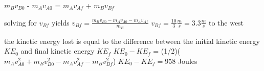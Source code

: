 $m_{B}v_{B0}$ - $m_{A}v_{A0}$ = $m_{A}v_{Af}$ + $m_{B}v_{Bf}$

solving for $v_{Bf}$ yields
$v_{Bf} = \frac{m_{B}v_{B0} - m_{A}v_{A0} - m_{A}v_{Af}}{m_{B}}$
$v_{Bf} = \frac{10}{3} \frac{m}{s} = 3.3 \frac{m}{s}$ to the west
                                                 
the kinetic energy lost is equal to the difference between the initial kinetic
energy $KE_{0}$ and final kinetic energy $KE_{f}$
$KE_{0} - KE_{f}$ = (1/2)($m_{A}v_{A0}^{2} + m_{B}v_{B0}^{2} - m_{A}v_{Af}^{2} - m_{B}v_{Bf}^{2}$)
$KE_{0} - KE_{f} = 958$ Joules
